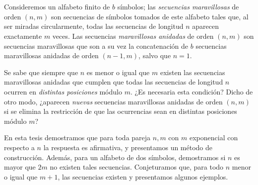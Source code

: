\chapter*{\runtitulo}

Consideremos un alfabeto finito de $b$ símbolos; las \emph{secuencias maravillosas}
de orden $(n,m)$ son secuencias de símbolos tomados de este alfabeto
tales que, al ser miradas circularmente, todas las
secuencias de longitud $n$ aparecen exactamente $m$ veces.
Las secuencias \emph{maravillosas anidadas} de orden $(n,m)$ son secuencias
maravillosas que son a su vez la concatenación de $b$ secuencias
maravillosas anidadas de orden $(n-1, m)$, salvo que $n = 1$.

Se sabe que siempre que $n$ es menor o igual que $m$ existen las secuencias
maravillosas anidadas que cumplen que todas las secuencias de longitud $n$
ocurren en \emph{distintas posiciones} módulo $m$.
¿Es necesaria esta condición? Dicho de otro modo, ¿aparecen \emph{nuevas} secuencias
maravillosas anidadas de orden $(n,m)$ si se elimina la restricción de que las
ocurrencias sean en distintas posiciones módulo $m$?

En esta tesis demostramos que para toda pareja $n, m$ con $m$ exponencial con
respecto a $n$ la respuesta es afirmativa, y presentamos un método de construcción.
Además, para un alfabeto de dos símbolos, demostramos si $n$ es mayor que $2m$
no existen tales secuencias.
Conjeturamos que, para todo $n$ menor o igual que $m + 1$, las secuencias
existen y presentamos algunos ejemplos.

\bigskip

